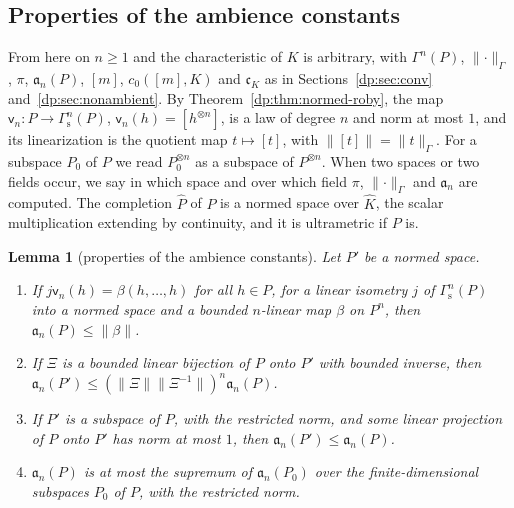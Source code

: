 \documentclass[11pt]{amsart}
\newtheorem{lemma}[theorem]{Lemma}
\theoremstyle{definition}
\theoremstyle{remark}
\numberwithin{equation}{section}
\newcommand{\norm}[1]{\lVert #1\rVert}
\newcommand{\Kh}{\widehat K}
\theoremstyle{plain}
\theoremstyle{definition}
\theoremstyle{plain}
\begin{document}
\subsection{Properties of the ambience constants}\label{dp:ac:constants}

From here on $n\ge1$ and the characteristic of $K$ is arbitrary, with $\Gamma^n(P)$, $\norm\cdot_\Gamma$, $\pi$, $\mathfrak a_n(P)$, $[m]$, $c_0([m],K)$ and $\mathfrak c_K$ as in Sections~\ref{dp:sec:conv} and~\ref{dp:sec:nonambient}. By Theorem~\ref{dp:thm:normed-roby}, the map $\mathsf v_n\colon P\to\Gamma^n_{\mathrm s}(P)$, $\mathsf v_n(h)=[h^{\otimes n}]$, is a law of degree $n$ and norm at most $1$, and its linearization is the quotient map $t\mapsto[t]$, with $\norm{[t]}=\norm t_\Gamma$. For a subspace $P_0$ of $P$ we read $P_0^{\otimes n}$ as a subspace of $P^{\otimes n}$. When two spaces or two fields occur, we say in which space and over which field $\pi$, $\norm\cdot_\Gamma$ and $\mathfrak a_n$ are computed. The completion $\widehat P$ of $P$ is a normed space over $\Kh$, the scalar multiplication extending by continuity, and it is ultrametric if $P$ is.

\begin{lemma}[properties of the ambience constants]\label{dp:lem:constants}
Let $P'$ be a normed space.
\begin{enumerate}
\item If $j\mathsf v_n(h)=\beta(h,\dots,h)$ for all $h\in P$, for a linear isometry $j$ of $\Gamma^n_{\mathrm s}(P)$ into a normed space and a bounded $n$\nobreakdash-linear map $\beta$ on $P^n$, then $\mathfrak a_n(P)\le\norm\beta$.
\item If $\Xi$ is a bounded linear bijection of $P$ onto $P'$ with bounded inverse, then $\mathfrak a_n(P')\le(\norm\Xi\norm{\Xi^{-1}})^n\mathfrak a_n(P)$.
\item If $P'$ is a subspace of $P$, with the restricted norm, and some linear projection of $P$ onto $P'$ has norm at most $1$, then $\mathfrak a_n(P')\le\mathfrak a_n(P)$.
\item $\mathfrak a_n(P)$ is at most the supremum of $\mathfrak a_n(P_0)$ over the finite-dimensional subspaces $P_0$ of $P$, with the restricted norm.
\end{enumerate}
\end{lemma}
\end{document}
